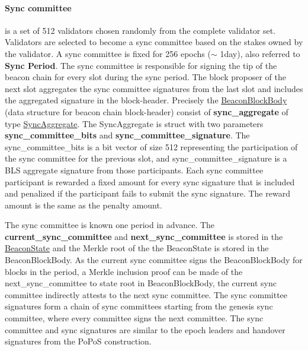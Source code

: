 \documentclass[a4paper,11pt,oneside]{article}
\theoremstyle{definition}
\begin{document}
  \paragraph{Sync committee} is a set of 512 validators chosen randomly from the complete validator set. Validators are selected to become a sync committee based on the stakes owned by the validator. A sync committee is fixed for 256 epochs ($\sim$ 1day), also referred to \textbf{Sync Period}. The sync committee is responsible for signing the tip of the beacon chain for every slot during the sync period. The block proposer of the next slot aggregates the sync committee signatures from the last slot and includes the aggregated signature in the block-header. Precisely the \href{https://github.com/ethereum/consensus-specs/blob/dev/specs/altair/beacon-chain.md#beaconblockbody}{BeaconBlockBody} (data structure for beacon chain block-header) consist of \textbf{sync\_aggregate} of type \href{https://github.com/ethereum/consensus-specs/blob/dev/specs/altair/beacon-chain.md#syncaggregate}{SyncAggregate}. The SyncAggregate is struct with two parameters \textbf{sync\_committee\_bits} and \textbf{sync\_committee\_signature}. The sync\_committee\_bits is a bit vector of size 512 representing the participation of the sync committee for the previous slot, and sync\_committee\_signature is a BLS aggregate signature from those participants. Each sync committee participant is rewarded a fixed amount for every sync signature that is included and penalized if the participant fails to submit the sync signature. The reward amount is the same as the penalty amount. 
  
  The sync committee is known one period in advance. The \textbf{current\_sync\_committee} and \textbf{next\_sync\_committee} is stored in the \href{https://github.com/ethereum/consensus-specs/blob/dev/specs/altair/beacon-chain.md#beaconstate}{BeaconState} and the Merkle root of the the BeaconState is stored in the BeaconBlockBody. As the current sync committee signs the BeaconBlockBody for blocks in the period, a Merkle inclusion proof can be made of the next\_sync\_committee to state root in BeaconBlockBody, the current sync committee indirectly attests to the next sync committee. The sync committee signatures form a chain of sync committees starting from the genesis sync committee, where every committee signs the next committee. The sync committee and sync signatures are similar to the epoch leaders and handover signatures from the PoPoS construction.   
   
\end{document}
